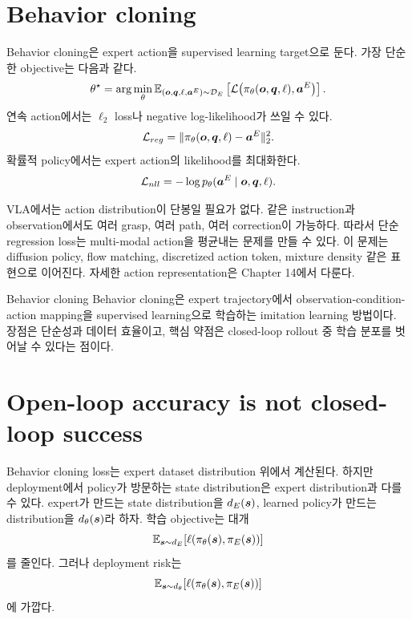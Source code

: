 \section{Behavior cloning}

Behavior cloning은 expert action을 supervised learning target으로 둔다. 가장 단순한 objective는 다음과 같다.
\begin{equation}
  \theta^\star
  =
  \arg\min_{\theta}
  \mathbb{E}_{(\bm{o},\bm{q},\ell,\bm{a}^E)\sim\mathcal{D}_{E}}
  \left[
  \mathcal{L}\bigl(\pi_{\theta}(\bm{o},\bm{q},\ell),\bm{a}^E\bigr)
  \right].
  \label{eq:bc-objective}
\end{equation}
연속 action에서는 $\ell_2$ loss나 negative log-likelihood가 쓰일 수 있다.
\begin{equation}
  \mathcal{L}_{reg}
  =
  \|\pi_{\theta}(\bm{o},\bm{q},\ell)-\bm{a}^E\|_2^2.
  \label{eq:l2-bc}
\end{equation}
확률적 policy에서는 expert action의 likelihood를 최대화한다.
\begin{equation}
  \mathcal{L}_{nll}
  =
  -\log p_{\theta}(\bm{a}^E\mid \bm{o},\bm{q},\ell).
  \label{eq:nll-bc}
\end{equation}

VLA에서는 action distribution이 단봉일 필요가 없다. 같은 instruction과 observation에서도 여러 grasp, 여러 path, 여러 correction이 가능하다. 따라서 단순 regression loss는 multi-modal action을 평균내는 문제를 만들 수 있다. 이 문제는 diffusion policy, flow matching, discretized action token, mixture density 같은 표현으로 이어진다. 자세한 action representation은 Chapter 14에서 다룬다.

\begin{definitionbox}{Behavior cloning}
Behavior cloning은 expert trajectory에서 observation-condition-action mapping을 supervised learning으로 학습하는 imitation learning 방법이다. 장점은 단순성과 데이터 효율이고, 핵심 약점은 closed-loop rollout 중 학습 분포를 벗어날 수 있다는 점이다.
\end{definitionbox}

\section{Open-loop accuracy is not closed-loop success}

Behavior cloning loss는 expert dataset distribution 위에서 계산된다. 하지만 deployment에서 policy가 방문하는 state distribution은 expert distribution과 다를 수 있다. expert가 만드는 state distribution을 $d_E(\bm{s})$, learned policy가 만드는 distribution을 $d_{\theta}(\bm{s})$라 하자. 학습 objective는 대개
\begin{equation}
  \mathbb{E}_{\bm{s}\sim d_E}
  [\ell(\pi_{\theta}(\bm{s}),\pi_E(\bm{s}))]
  \label{eq:expert-distribution-loss}
\end{equation}
를 줄인다. 그러나 deployment risk는
\begin{equation}
  \mathbb{E}_{\bm{s}\sim d_{\theta}}
  [\ell(\pi_{\theta}(\bm{s}),\pi_E(\bm{s}))]
  \label{eq:policy-distribution-loss}
\end{equation}
에 가깝다.

